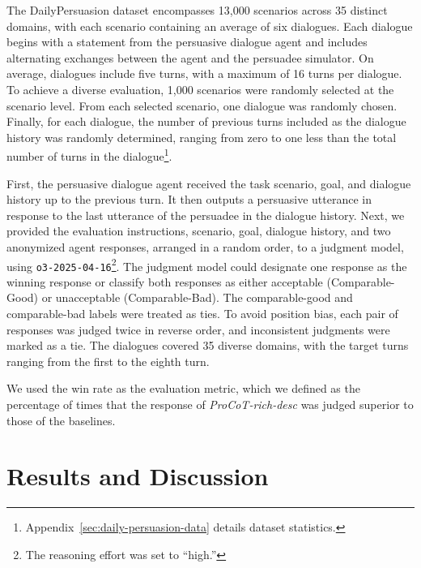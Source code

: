 \documentclass[11pt]{article}
\begin{document}
The DailyPersuasion dataset encompasses 13,000 scenarios across 35 distinct domains, with each scenario containing an average of six dialogues. 
Each dialogue begins with a statement from the persuasive dialogue agent and includes alternating exchanges between the agent and the persuadee simulator. 
On average, dialogues include five turns, with a maximum of 16 turns per dialogue.
To achieve a diverse evaluation, 1,000 scenarios were randomly selected at the scenario level. 
From each selected scenario, one dialogue was randomly chosen. 
Finally, for each dialogue, the number of previous turns included as the dialogue history was randomly determined, ranging from zero to one less than the total number of turns in the dialogue\footnote{Appendix~\ref{sec:daily-persuasion-data} details dataset statistics.}.

First, the persuasive dialogue agent received the task scenario, goal, and dialogue history up to the previous turn.
It then outputs a persuasive utterance in response to the last utterance of the persuadee in the dialogue history.
Next, we provided the evaluation instructions, scenario, goal, dialogue history, and two anonymized agent responses, arranged in a random order, to a judgment model, using \texttt{o3-2025-04-16}\footnote{The reasoning effort was set to ``high.''}.
The judgment model could designate one response as the winning response or classify both responses as either acceptable (Comparable-Good) or unacceptable (Comparable-Bad). 
The comparable-good and comparable-bad labels were treated as ties.
To avoid position bias, each pair of responses was judged twice in reverse order, and inconsistent judgments were marked as a tie.
The dialogues covered 35 diverse domains, with the target turns ranging from the first to the eighth turn.

We used the win rate as the evaluation metric, which we defined as the percentage of times that the response of \textit{ProCoT-rich-desc} was judged superior to those of the baselines.

\section{Results and Discussion}
\end{document}
